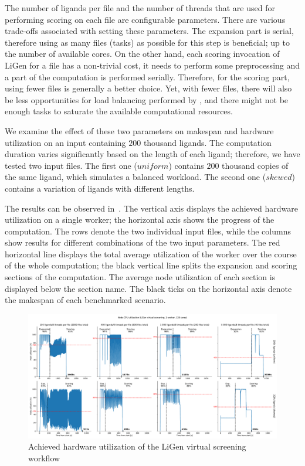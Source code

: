 The number of ligands per file and the number of threads that are used for performing scoring on
each file are configurable parameters. There are various trade-offs associated with setting these
parameters. The expansion part is serial, therefore using as many files (tasks) as possible for
this step is beneficial; up to the number of available cores. On the other hand, each scoring
invocation of LiGen for a file has a non-trivial cost, it needs to perform some preprocessing and a
part of the computation is performed serially. Therefore, for the scoring part, using fewer files
is generally a better choice. Yet, with fewer files, there will also be less opportunities for load
balancing performed by \hq{}, and there might not be enough tasks to saturate
the available computational resources.

We examine the effect of these two parameters on makespan and hardware utilization on an input
containing $200$ thousand ligands. The computation duration varies significantly
based on the length of each ligand; therefore, we have tested two input files. The first one
($uniform$) contains $200$ thousand copies of the same ligand,
which simulates a balanced workload. The second one ($skewed$) contains a variation
of ligands with different lengths.

The results can be observed in~. The vertical axis displays the achieved
hardware utilization on a single worker; the horizontal axis shows the progress of the computation.
The rows denote the two individual input files, while the columns show results for different
combinations of the two input parameters. The red horizontal line displays the total average
utilization of the worker over the course of the whole computation; the black vertical line splits
the expansion and scoring sections of the computation. The average node utilization of each section
is displayed below the section name. The black ticks on the horizontal axis denote the makespan of
each benchmarked scenario.

\begin{figure}[h]
	\centering
	\includegraphics[width=\textwidth]{imgs/hq/charts/ligen-aggregation-utilization}
	\caption{Achieved hardware utilization of the LiGen virtual screening workflow}
	\label{fig:hq-ligen-utilization}
\end{figure}

